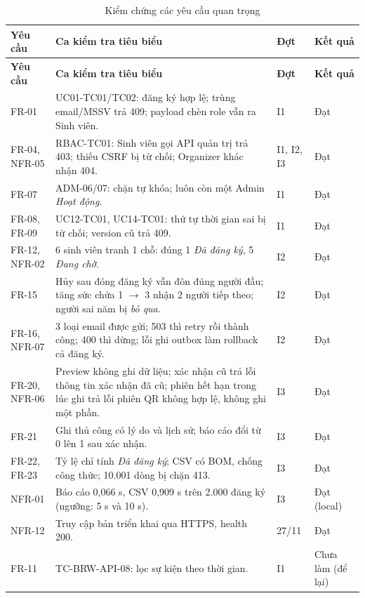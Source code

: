 \begingroup\footnotesize
\renewcommand{\arraystretch}{1.15}
\begin{longtable}{@{}p{.12\linewidth}p{.50\linewidth}p{.15\linewidth}p{.14\linewidth}@{}}
\caption{Kiểm chứng các yêu cầu quan trọng}\label{tab:t3-verification}\\
\toprule
\textbf{Yêu cầu} & \textbf{Ca kiểm tra tiêu biểu} & \textbf{Đợt} & \textbf{Kết quả}\\\midrule\endfirsthead
\toprule
\textbf{Yêu cầu} & \textbf{Ca kiểm tra tiêu biểu} & \textbf{Đợt} & \textbf{Kết quả}\\\midrule\endhead
\bottomrule\endfoot
FR-01 & UC01-TC01/TC02: đăng ký hợp lệ; trùng email/MSSV trả 409; payload chèn role vẫn ra Sinh viên. & I1 & Đạt\\
FR-04, NFR-05 & RBAC-TC01: Sinh viên gọi API quản trị trả 403; thiếu CSRF bị từ chối; Organizer khác nhận 404. & I1, I2, I3 & Đạt\\
FR-07 & ADM-06/07: chặn tự khóa; luôn còn một Admin \textit{Hoạt động}. & I1 & Đạt\\
FR-08, FR-09 & UC12-TC01, UC14-TC01: thứ tự thời gian sai bị từ chối; version cũ trả 409. & I1 & Đạt\\
FR-12, NFR-02 & 6 sinh viên tranh 1 chỗ: đúng 1 \textit{Đã đăng ký}, 5 \textit{Đang chờ}. & I2 & Đạt\\
FR-15 & Hủy sau đóng đăng ký vẫn đôn đúng người đầu; tăng sức chứa 1 $\to$ 3 nhận 2 người tiếp theo; người sai năm bị \textit{bỏ qua}. & I2 & Đạt\\
FR-16, NFR-07 & 3 loại email được gửi; 503 thì retry rồi thành công; 400 thì dừng; lỗi ghi outbox làm rollback cả đăng ký. & I2 & Đạt\\
FR-20, NFR-06 & Preview không ghi dữ liệu; xác nhận cũ trả lỗi thông tin xác nhận đã cũ; phiên hết hạn trong lúc ghi trả lỗi phiên QR không hợp lệ, không ghi một phần. & I3 & Đạt\\
FR-21 & Ghi thủ công có lý do và lịch sử; báo cáo đổi từ 0 lên 1 sau xác nhận. & I3 & Đạt\\
FR-22, FR-23 & Tỷ lệ chỉ tính \textit{Đã đăng ký}; CSV có BOM, chống công thức; 10.001 dòng bị chặn 413. & I3 & Đạt\\
NFR-01 & Báo cáo 0,066 s, CSV 0,909 s trên 2.000 đăng ký (ngưỡng: 5 s và 10 s). & I3 & Đạt (local)\\
NFR-12 & Truy cập bản triển khai qua HTTPS, health 200. & 27/11 & Đạt\\
FR-11 & TC-BRW-API-08: lọc sự kiện theo thời gian. & I1 & Chưa làm (để lại)\\
\end{longtable}
\endgroup

